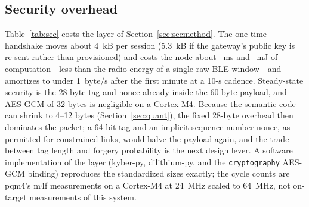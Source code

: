 \documentclass[journal]{IEEEtran}
\begin{document}
\subsection{Security overhead}\label{sec:security}
\begin{table}[!t]
\centering
\caption{Post-quantum-ready layer: standardized sizes \cite{fips203,fips204} and node-side cost from pqm4 Cortex-M4 cycle counts \cite{pqm4} at 64~MHz and 9.9~mW.}
\label{tab:sec}
\footnotesize
{}
\end{table}
Table~\ref{tab:sec} costs the layer of Section~\ref{sec:secmethod}. The one-time handshake moves about 4~kB per session (5.3~kB if the gateway's public key is re-sent rather than provisioned) and costs the node about \pqNodeMs~ms and \pqNodeMJ~mJ of computation---less than the radio energy of a single raw BLE window---and amortizes to under 1~byte/s after the first minute at a 10-s cadence. Steady-state security is the 28-byte tag and nonce already inside the 60-byte payload, and AES-GCM of 32 bytes is negligible on a Cortex-M4. Because the semantic code can shrink to 4--12 bytes (Section~\ref{sec:quant}), the fixed 28-byte overhead then dominates the packet; a 64-bit tag and an implicit sequence-number nonce, as permitted for constrained links, would halve the payload again, and the trade between tag length and forgery probability is the next design lever. A software implementation of the layer (kyber-py, dilithium-py, and the \texttt{cryptography} AES-GCM binding) reproduces the standardized sizes exactly; the cycle counts are pqm4's m4f measurements on a Cortex-M4 at 24~MHz scaled to 64~MHz, not on-target measurements of this system.
\end{document}
